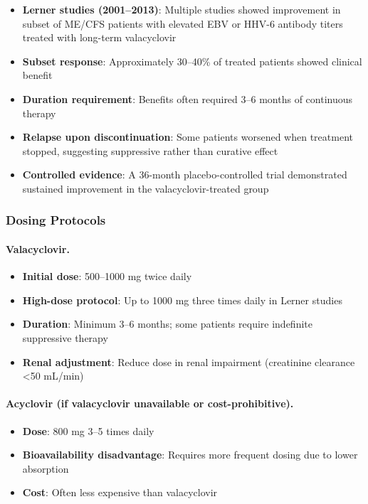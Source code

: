 \begin{itemize}
    \item \textbf{Lerner studies (2001--2013)}: Multiple studies showed improvement in subset of ME/CFS patients with elevated EBV or HHV-6 antibody titers treated with long-term valacyclovir~\cite{Lerner2002valacyclovir,Lerner2007valacyclovir,Lerner2010antivirals}
    \item \textbf{Subset response}: Approximately 30--40\% of treated patients showed clinical benefit~\cite{Lerner2010antivirals}
    \item \textbf{Duration requirement}: Benefits often required 3--6 months of continuous therapy~\cite{Lerner2007valacyclovir}
    \item \textbf{Relapse upon discontinuation}: Some patients worsened when treatment stopped, suggesting suppressive rather than curative effect
    \item \textbf{Controlled evidence}: A 36-month placebo-controlled trial demonstrated sustained improvement in the valacyclovir-treated group~\cite{Lerner2007valacyclovir}
\end{itemize}

\subsubsection{Dosing Protocols}

\paragraph{Valacyclovir.}
\begin{itemize}
    \item \textbf{Initial dose}: 500--1000 mg twice daily
    \item \textbf{High-dose protocol}: Up to 1000 mg three times daily in Lerner studies
    \item \textbf{Duration}: Minimum 3--6 months; some patients require indefinite suppressive therapy
    \item \textbf{Renal adjustment}: Reduce dose in renal impairment (creatinine clearance <50 mL/min)
\end{itemize}

\paragraph{Acyclovir (if valacyclovir unavailable or cost-prohibitive).}
\begin{itemize}
    \item \textbf{Dose}: 800 mg 3--5 times daily
    \item \textbf{Bioavailability disadvantage}: Requires more frequent dosing due to lower absorption
    \item \textbf{Cost}: Often less expensive than valacyclovir
\end{itemize}

